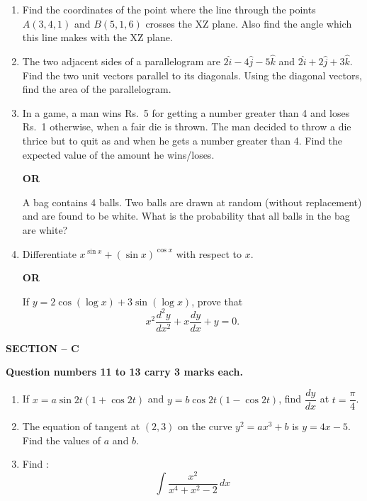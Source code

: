 \documentclass[12pt,a4paper]{article}
\newcommand{\rupee}{\textrm{Rs.}}
\begin{document}
\begin{enumerate}[label=\textbf{\arabic*.}, leftmargin=*, itemsep=1.2em, start=7]

\item Find the coordinates of the point where the line through the points $A(3, 4, 1)$ and $B(5, 1, 6)$ crosses the XZ plane. Also find the angle which this line makes with the XZ plane.

\item The two adjacent sides of a parallelogram are $2\hat{i} - 4\hat{j} - 5\hat{k}$ and $2\hat{i} + 2\hat{j} + 3\hat{k}$. Find the two unit vectors parallel to its diagonals. Using the diagonal vectors, find the area of the parallelogram.

\item In a game, a man wins \rupee~5 for getting a number greater than 4 and loses \rupee~1 otherwise, when a fair die is thrown. The man decided to throw a die thrice but to quit as and when he gets a number greater than 4. Find the expected value of the amount he wins/loses.

\textbf{OR}

A bag contains 4 balls. Two balls are drawn at random (without replacement) and are found to be white. What is the probability that all balls in the bag are white?

\item Differentiate $x^{\sin x} + (\sin x)^{\cos x}$ with respect to $x$.

\textbf{OR}

If $y = 2\cos(\log x) + 3\sin(\log x)$, prove that
\[
x^2 \frac{d^2y}{dx^2} + x\frac{dy}{dx} + y = 0.
\]

\end{enumerate}

\begin{center}
  \textbf{SECTION -- C}
\end{center}

\begin{center}
  \textbf{Question numbers 11 to 13 carry 3 marks each.}
\end{center}

\vspace{0.3cm}

\begin{enumerate}[label=\textbf{\arabic*.}, leftmargin=*, itemsep=1.2em, start=11]

\item If $x = a \sin 2t (1 + \cos 2t)$ and $y = b \cos 2t (1 - \cos 2t)$, find $\dfrac{dy}{dx}$ at $t = \dfrac{\pi}{4}$.

\item The equation of tangent at $(2, 3)$ on the curve $y^2 = ax^3 + b$ is $y = 4x - 5$. Find the values of $a$ and $b$.

\item Find :
\[
\int \frac{x^2}{x^4 + x^2 - 2} \, dx
\]

\end{enumerate}
\end{document}
